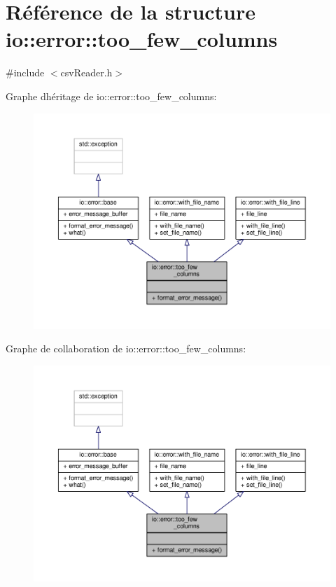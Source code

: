 \hypertarget{structio_1_1error_1_1too__few__columns}{}\section{Référence de la structure io\+:\+:error\+:\+:too\+\_\+few\+\_\+columns}
\label{structio_1_1error_1_1too__few__columns}


{\ttfamily \#include $<$csv\+Reader.\+h$>$}



Graphe d\textquotesingle{}héritage de io\+:\+:error\+:\+:too\+\_\+few\+\_\+columns\+:
\nopagebreak
\begin{figure}[H]
\begin{center}
\leavevmode
\includegraphics[width=350pt]{structio_1_1error_1_1too__few__columns__inherit__graph}
\end{center}
\end{figure}


Graphe de collaboration de io\+:\+:error\+:\+:too\+\_\+few\+\_\+columns\+:
\nopagebreak
\begin{figure}[H]
\begin{center}
\leavevmode
\includegraphics[width=350pt]{structio_1_1error_1_1too__few__columns__coll__graph}
\end{center}
\end{figure}
